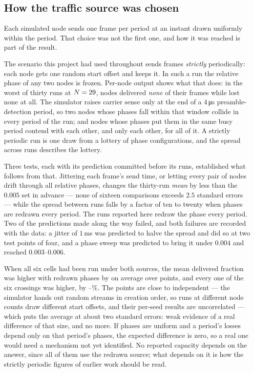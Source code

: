 \subsection{How the traffic source was chosen}

Each simulated node sends one frame per period at an instant drawn uniformly within the period.
That choice was not the first one, and how it was reached is part of the result.

The scenario this project had used throughout sends frames \emph{strictly} periodically: each
node gets one random start offset and keeps it. In such a run the relative phase of any two
nodes is frozen. Per-node output shows what that does: in the worst of thirty runs at
$N = 29$, \phaseSilentNodes{} nodes delivered \emph{none} of their frames while
\phaseCleanNodes{} lost none at all. The simulator raises
carrier sense only at the end of a $4$\,\si{\micro\second} preamble-detection period, so two nodes
whose phases fall within that window collide in every period of the run; and nodes whose phases
put them in the same busy period contend with each other, and only each other, for all of it. A
strictly periodic run is one draw from a lottery of phase configurations, and the spread across
runs describes the lottery.

Three tests, each with its prediction committed before its runs, established what follows from
that. Jittering each frame's send time, or letting every pair of nodes drift through all relative
phases, changes the thirty-run \emph{mean} by less than the $0.005$ set in advance --- none of
sixteen comparisons exceeds $2.5$ standard errors --- while the spread between runs falls by a
factor of ten to twenty when phases are redrawn every period. The runs reported here redraw the
phase every period. Two of the predictions made along the way failed, and both failures are
recorded with the data: a jitter of $1$\,ms was predicted to halve the spread and did so at two
test points of four, and a phase sweep was predicted to bring it under $0.004$ and reached
$0.003$--$0.006$.

\begin{remark}
When all six cells had been run under both sources, the mean delivered fraction was higher with
redrawn phases by \srcMeanDiff{} on average over \srcPoints{} points, and every one of the six
crossings was higher, by \srcShiftLo--\srcShiftHi\%. The points are close to independent ---
the simulator hands out random streams in creation order, so runs at different node counts draw
different start offsets, and their per-seed results are uncorrelated --- which puts the average
at about two standard errors: weak evidence of a real difference of that size, and no more. If
phases are uniform and a period's losses depend only on that period's phases, the expected
difference is zero, so a real one would need a mechanism not yet identified. No reported capacity
depends on the answer, since all of them use the redrawn source; what depends on it is how the
strictly periodic figures of earlier work should be read.
\end{remark}

